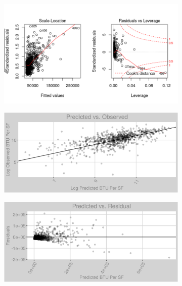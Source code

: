 \begin{figure}[h]
\begin{subfigure}{1\textwidth}
\includegraphics[width=.99\textwidth, height=0.3\textheight]{Images/natural_gas_psf_nn_full_resid_2.png}
\end{subfigure}
\begin{subfigure}{1\textwidth}
\centering
\includegraphics[width=.99\textwidth, height=0.3\textheight]{Images/natural_gas_psf_nn_full_pvo.png}
\end{subfigure}
\begin{subfigure}{1\textwidth}
\centering
\includegraphics[width=.99\textwidth, height=0.3\textheight]{Images/natural_gas_psf_nn_full_pvr.png}
\end{subfigure}
\end{figure}

